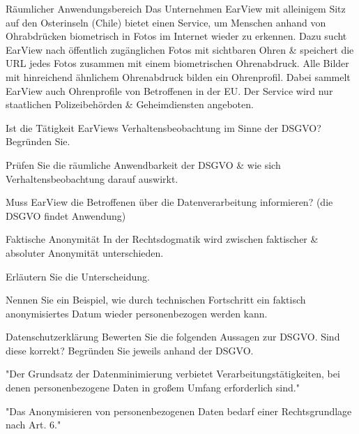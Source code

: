 \documentclass{exercisesheet}
\begin{document}
\begin{eexercises}{Räumlicher Anwendungsbereich}{
    Das Unternehmen EarView mit alleinigem Sitz auf den Osterinseln (Chile) bietet einen Service, um Menschen anhand von Ohrabdrücken biometrisch in Fotos im Internet wieder zu erkennen. Dazu sucht EarView nach öffentlich zugänglichen Fotos mit sichtbaren Ohren \& speichert die URL jedes Fotos zusammen mit einem biometrischen Ohrenabdruck. Alle Bilder mit hinreichend ähnlichem Ohrenabdruck bilden ein Ohrenprofil. Dabei sammelt EarView auch Ohrenprofile von Betroffenen in der EU. Der Service wird nur staatlichen Polizeibehörden \& Geheimdiensten angeboten.
  }
  \item Ist die Tätigkeit EarViews Verhaltensbeobachtung im Sinne der DSGVO? Begründen Sie.
  \item Prüfen Sie die räumliche Anwendbarkeit der DSGVO \& wie sich Verhaltensbeobachtung darauf auswirkt.
  \item Muss EarView die Betroffenen über die Datenverarbeitung informieren? (die DSGVO findet Anwendung)
\end{eexercises}

\begin{eexercises}{Faktische Anonymität}{
    In der Rechtsdogmatik wird zwischen faktischer \& absoluter Anonymität unterschieden.
  }
  \item Erläutern Sie die Unterscheidung.
  \item Nennen Sie ein Beispiel, wie durch technischen Fortschritt ein faktisch anonymisiertes Datum wieder personenbezogen werden kann.
\end{eexercises}

\begin{eexercises}[2]{Datenschutzerklärung}{
    Bewerten Sie die folgenden Aussagen zur DSGVO. Sind diese korrekt? Begründen Sie jeweils anhand der DSGVO.
  }
  \item "Der Grundsatz der Datenminimierung verbietet Verarbeitungstätigkeiten, bei denen personenbezogene Daten in großem Umfang erforderlich sind."
  \item "Das Anonymisieren von personenbezogenen Daten bedarf einer Rechtsgrundlage nach Art. 6."
\end{eexercises}
\end{document}

